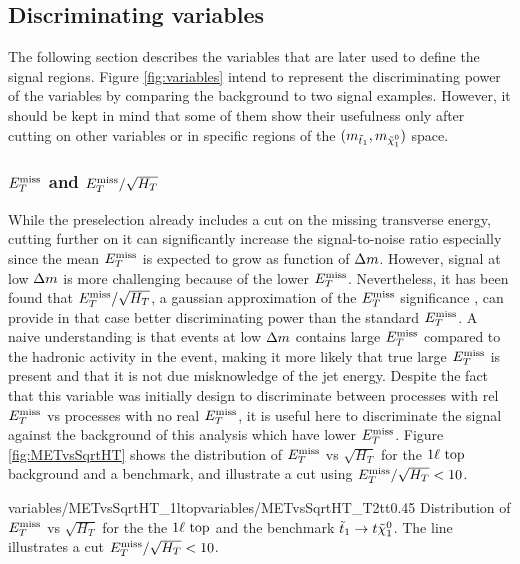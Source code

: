     \subsection{Discriminating variables \label{sec:analysis_variables}}

        The following section describes the variables that are later used to define the
        signal regions. Figure \ref{fig:variables} intend to represent the discriminating
        power of the variables by comparing the background to two signal examples. However,
        it should be kept in mind that some of them show their usefulness only after
        cutting on other variables or in specific regions of the $(m_{\tilde{t}_1},m_{\tilde{\chi}_1^0})$ space.

           \subsubsection{$E_T^\text{miss}$ and $E_T^\text{miss}/\sqrt{H_T}$}

        While the preselection already includes a cut on the missing transverse energy,
        cutting further on it can significantly increase the signal-to-noise ratio especially
        since the mean $E_T^\text{miss}$ is expected to grow as function of $\Delta m$. However, signal
        at low $\Delta m$ is more challenging because of the lower $E_T^\text{miss}$. Nevertheless,
        it has been found that $E_T^\text{miss}/\sqrt{H_T}$, a gaussian approximation of the $E_T^\text{miss}$
        significance \cite{METsignificanceMirman, METperf}, can provide in that case better
        discriminating power than the
        standard $E_T^\text{miss}$. A naive understanding is that events at low $\Delta m$ contains
        large $E_T^\text{miss}$ compared to the hadronic activity in the event, making it more likely
        that true large $E_T^\text{miss}$ is present and that it is not due misknowledge of the jet
        energy. Despite the fact that this variable was initially design to discriminate
        between processes with rel $E_T^\text{miss}$ vs processes with no real $E_T^\text{miss}$, it is useful here
        to discriminate the signal against the background of this analysis which have lower
        $E_T^\text{miss}$. Figure \ref{fig:METvsSqrtHT} shows the distribution of $E_T^\text{miss}$ vs $\sqrt{H_T}$
        for the $1\ell~\text{top}$ background and a benchmark, and illustrate a cut using
        $E_T^\text{miss} / \sqrt{H_T} < 10$. 

                         {variables/METvsSqrtHT_1ltop}{variables/METvsSqrtHT_T2tt}{0.45}
                         {Distribution of $E_T^\text{miss}$ vs $\sqrt{H_T}$ for the the
                         $1\ell~\text{top}$ and the benchmark $\tilde{t}_1 \rightarrow t \tilde{\chi}_1^0$.
                         The line illustrates a cut $E_T^\text{miss} / \sqrt{H_T} < 10$.}

